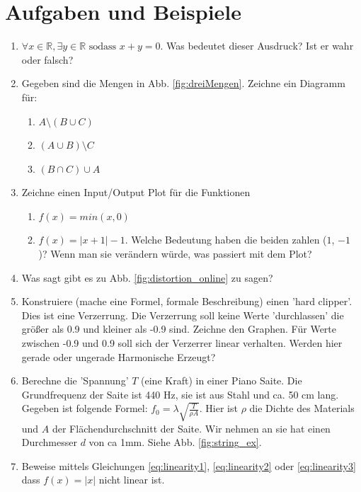 \section{Aufgaben und Beispiele}

\begin{enumerate}
    \item $\forall x \in \mathbb{R}, \exists y \in \mathbb{R} \text{ sodass } x + y = 0$. Was bedeutet dieser Ausdruck? Ist er wahr oder falsch?
    \item Gegeben sind die Mengen in Abb. \ref{fig:dreiMengen}. Zeichne ein Diagramm für:
    \begin{enumerate} %
        \item $A \setminus (B \cup C)$
        \item $(A \cup B) \setminus C$
        \item $(B \cap C) \cup A$
    \end{enumerate}
    \item Zeichne einen Input/Output Plot für die Funktionen 
    \begin{enumerate} %
        \item $f(x) = min(x, 0)$
        \item $f(x) = |x+1|-1$. Welche Bedeutung haben die beiden zahlen ($1$, $-1$ )? Wenn man sie verändern würde, was passiert mit dem Plot?
    \end{enumerate}
    \item Was sagt gibt es zu Abb. \ref{fig:distortion_online} zu sagen?
    \item Konstruiere (mache eine Formel, formale Beschreibung) einen 'hard clipper'. Dies ist eine Verzerrung. Die Verzerrung soll keine Werte 'durchlassen' die größer als 0.9 und kleiner als -0.9 sind. Zeichne den Graphen. Für Werte zwischen -0.9 und 0.9 soll sich der Verzerrer linear verhalten. Werden hier gerade oder ungerade Harmonische Erzeugt?
    \item Berechne die 'Spannung' $T$ (eine Kraft) in einer Piano Saite. Die Grundfrequenz der Saite ist 440 Hz, sie ist aus Stahl und ca. 50 cm lang. Gegeben ist folgende Formel: $f_0 = \lambda \sqrt{\frac{T}{\rho A}}$. Hier ist $\rho$ die Dichte des Materials und $A$ der Flächendurchschnitt der Saite. Wir nehmen an sie hat einen Durchmesser $d$ von ca 1mm. Siehe Abb. \ref{fig:string_ex}.

    \item Beweise mittels Gleichungen \ref{eq:linearity1}, \ref{eq:linearity2} oder \ref{eq:linearity3} dass $f(x)=|x|$ nicht linear ist.



\end{enumerate}

